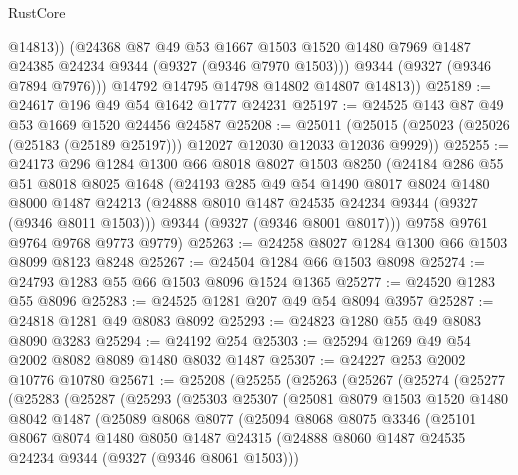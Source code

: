 \begin{lexlean}{RustCore}
\begin{coremodule}
              @14813))
          (@24368
            @87
            @49
            @53
            @1667
            @1503
            @1520
            @1480
            @7969
            @1487
            @24385
            @24234
            @9344
            (@9327 (@9346 @7970 @1503)))
          @9344
          (@9327 (@9346 @7894 @7976)))
        @14792
        @14795
        @14798
        @14802
        @14807
        @14813))
@25189 := @24617 @196 @49 @54 @1642 @1777 @24231
@25197 := @24525 @143 @87 @49 @53 @1669 @1520 @24456 @24587
@25208 := @25011
    (@25015 (@25023 (@25026 (@25183 (@25189 @25197))) @12027 @12030 @12033 @12036 @9929))
@25255 := @24173
    @296
    @1284
    @1300
    @66
    @8018
    @8027
    @1503
    @8250
    (@24184
      @286
      @55
      @51
      @8018
      @8025
      @1648
      (@24193
        @285
        @49
        @54
        @1490
        @8017
        @8024
        @1480
        @8000
        @1487
        @24213
        (@24888 @8010 @1487 @24535 @24234 @9344 (@9327 (@9346 @8011 @1503)))
        @9344
        (@9327 (@9346 @8001 @8017)))
      @9758
      @9761
      @9764
      @9768
      @9773
      @9779)
@25263 := @24258 @8027 @1284 @1300 @66 @1503 @8099 @8123 @8248
@25267 := @24504 @1284 @66 @1503 @8098
@25274 := @24793 @1283 @55 @66 @1503 @8096 @1524 @1365
@25277 := @24520 @1283 @55 @8096
@25283 := @24525 @1281 @207 @49 @54 @8094 @3957
@25287 := @24818 @1281 @49 @8083 @8092
@25293 := @24823 @1280 @55 @49 @8083 @8090 @3283
@25294 := @24192 @254
@25303 := @25294 @1269 @49 @54 @2002 @8082 @8089 @1480 @8032 @1487
@25307 := @24227 @253 @2002 @10776 @10780
@25671 := @25208
    (@25255
      (@25263
        (@25267
          (@25274
            (@25277
              (@25283
                (@25287
                  (@25293
                    (@25303
                      @25307
                      (@25081
                        @8079
                        @1503
                        @1520
                        @1480
                        @8042
                        @1487
                        (@25089
                          @8068
                          @8077
                          (@25094
                            @8068
                            @8075
                            @3346
                            (@25101
                              @8067
                              @8074
                              @1480
                              @8050
                              @1487
                              @24315
                              (@24888 @8060 @1487 @24535 @24234 @9344 (@9327 (@9346 @8061 @1503)))

\end{coremodule}
\end{lexlean}
